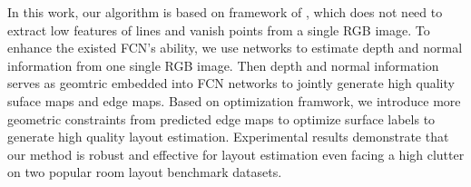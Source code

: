 


In this work, our algorithm is based on framework of \cite{dasgupta2016delay}, which does not need to extract low features of lines and vanish points from a single RGB image. To enhance the existed FCN's ability, we use networks to estimate depth and normal information from one single RGB image. Then depth and normal information serves as geomtric embedded into FCN networks to jointly generate high quality suface maps and edge maps. Based on\cite{dasgupta2016delay} optimization framwork, we introduce more geometric constraints from predicted edge maps to optimize surface labels to generate high quality layout estimation. Experimental results demonstrate that our method is robust and effective for layout estimation even facing a high clutter on two popular room layout benchmark datasets.
 
 




	
	

